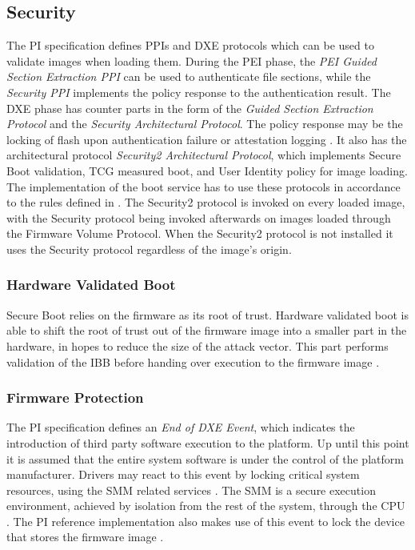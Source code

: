 
\subsection{Security}
\label{sec:uefi-pi:pi:security}

The \ac{PI} specification defines \acp{PPI} and \ac{DXE} protocols which can be used to validate images when loading them.
During the \ac{PEI} phase, the \emph{\ac{PEI} Guided Section Extraction \ac{PPI}} can be used to authenticate file sections, while the \emph{Security \ac{PPI}} implements the policy response to the authentication result.
The \ac{DXE} phase has counter parts in the form of the \emph{Guided Section Extraction Protocol} and the \emph{Security Architectural Protocol}.
The policy response may be the locking of flash upon authentication failure or attestation logging \cite[Vol. 2, Section 12.9.1]{pi-spec}.
It also has the architectural protocol \emph{Security2 Architectural Protocol}, which implements Secure Boot validation, \ac{TCG} measured boot, and User Identity policy for image loading.
The implementation of the boot service  has to use these protocols in accordance to the rules defined in \cite[Vol. 2, Section 12.9.2]{pi-spec}.
The Security2 protocol is invoked on every loaded image, with the Security protocol being invoked afterwards on images loaded through the Firmware Volume Protocol.
When the Security2 protocol is not installed it uses the Security protocol regardless of the image's origin.

\subsubsection{Hardware Validated Boot}

Secure Boot relies on the firmware as its root of trust.
Hardware validated boot is able to shift the root of trust out of the firmware image into a smaller part in the hardware, in hopes to reduce the size of the attack vector.
This part performs validation of the \ac{IBB} before handing over execution to the firmware image \cite{tianocore-understanding-uefi-secure-boot-chain}.

\subsubsection{Firmware Protection}

The \ac{PI} specification defines an \emph{End of \acs{DXE} Event}, which indicates the introduction of third party software execution to the platform.
Up until this point it is assumed that the entire system software is under the control of the platform manufacturer.
Drivers may react to this event by locking critical system resources, using the \ac{SMM} related services \cite[Vol. 2, 5.1.2.1]{pi-spec}.
The \ac{SMM} is a secure execution environment, achieved by isolation from the rest of the system, through the \ac{CPU} \cite[Vol. 4, Section 1.3]{pi-spec}.
The \ac{PI} reference implementation also makes use of this event to lock the device that stores the firmware image \cite{tianocore-edk2-fmpdxe}.
